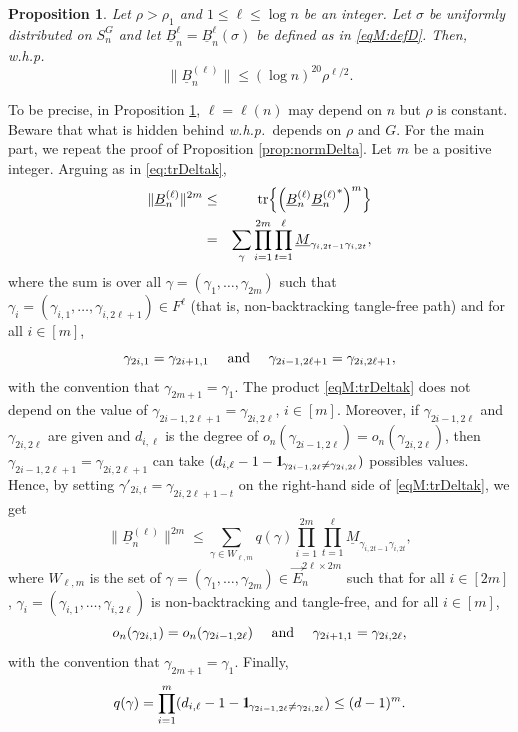 \documentclass[11pt]{article}
\newtheorem{proposition}[lemma]{Proposition}
\newcommand{\tr}{{\rm tr}}
\newcommand{\BRA}[1]{{{\left\{#1\right\}}}}
\newcommand{\PAR}[1]{{{\left(#1\right)}}} %
\newcommand{\uB}{{\underline B}}
\newcommand{\1}{1\!\!{\sf I}}\newcommand{\IND}{\1}
\newcommand{\whp}{{w.h.p.~}}
\begin{document}
\begin{proposition} \label{propM:normDelta}
Let  $\rho > \rho_1$ and $1 \leq \ell  \leq  \log n$ be an integer.  Let $\sigma$ be uniformly distributed on $S^G_n$ and  let $\uB^\ell _n = \uB^\ell_n (\sigma)$ be defined as in \eqref{eqM:defD}.  
Then, \whp  
$$ \| \uB_n^{(\ell)} \| \leq ( \log n) ^{20}   \rho ^{\ell/2}.$$
\end{proposition}
To be precise, in Proposition \ref{propM:normDelta}, $\ell = \ell(n)$ may depend on $n$ but $\rho$ is constant. Beware that what is hidden behind {\em\whp}depends on $\rho$ and $G$. For the main part, we repeat the proof of Proposition \ref{prop:normDelta}. Let $m$ be a positive integer.  Arguing as in \eqref{eq:trDeltak},
\begin{eqnarray}
\|\uB_n^{(\ell)}  \| ^{2 m}  & \leq & \tr \BRA{ \PAR{  \uB_n^{(\ell)}{\uB_n^{(\ell)}}^*}^{m}  } \nonumber\\
& =  &  \sum_{\gamma }   \prod_{i=1}^{2m}  \prod_{t=1}^{\ell} \underline M_{\gamma_{i,2t-1}  \gamma_{i,2t}} ,  \label{eqM:trDeltak}
\end{eqnarray}
where the sum is over all  $\gamma = ( \gamma_1, \ldots, \gamma_{2m})$ such that $\gamma_i = (\gamma_{i,1}, \ldots, \gamma_{i,2\ell+1}) \in F^{\ell}$ (that is, non-backtracking tangle-free path) and for all $i \in [m]$, 
$$
\gamma_{2i,1} = \gamma_{2i+1, 1} \quad \hbox{ and } \quad  \gamma_{2i-1,2\ell+1} = \gamma_{2i, 2\ell+1},
$$
with the convention that $\gamma_{2m+1} = \gamma_{1}$. The product \eqref{eqM:trDeltak} does not depend on the value of $\gamma_{2i-1,2\ell+1} = \gamma_{2i, 2\ell}$, $i \in[ m]$. Moreover, if $\gamma_{2i-1,2\ell}$ and $\gamma_{2i,2\ell}$ are given and $d_{i,\ell}$ is the degree of $o_n(\gamma_{2i-1,2\ell})  = o_n(\gamma_{2i,2\ell})$, then $\gamma_{2i-1,2\ell+1} = \gamma_{2i, 2\ell+1}$ can take $(d_{i,\ell} - 1 - \IND_{\gamma_{2i-1,2\ell} \ne \gamma_{2i, 2\ell}} )$ possibles values. Hence, by setting $\gamma'_{2i,t} = \gamma_{2i, 2 \ell +1 -t }$ on the right-hand side of \eqref{eqM:trDeltak}, we get 
\begin{equation}\label{eqM:trDeltak2}
\| \uB_n^{(\ell)}  \| ^{2 m}  \leq   \sum_{\gamma \in W_{\ell,m}}  q(\gamma) \prod_{i=1}^{2m}  \prod_{t=1}^{\ell} \underline M_{\gamma_{i,2t-1}  \gamma_{i,2t}} , 
\end{equation}
where $W_{\ell,m}$ is the set of $\gamma = ( \gamma_1, \ldots, \gamma_{2m}) \in   \vec E_n^{2 \ell \times 2m}$ such that for all $i \in [2m]$, $\gamma_i = (\gamma_{i,1}, \ldots, \gamma_{i,2\ell})$ is non-backtracking and tangle-free, and for all $i \in [m]$, 
\begin{equation}\label{eqM:defbound}
o_n(\gamma_{2i,1}) = o_n(\gamma_{2i-1, 2\ell})  \quad \hbox{ and } \quad  \gamma_{2i+1,1} = \gamma_{2i, 2\ell},
\end{equation}
with the convention that $\gamma_{2m+1} = \gamma_{1}$. Finally,
\begin{equation}\label{eqM:defqg}
q(\gamma)   = \prod_{i=1}^{m} ( d_{i,\ell} - 1 - \IND_{\gamma_{2i-1,2\ell} \ne \gamma_{2i, 2\ell}}  ) \leq (d-1)^{m}.
\end{equation}
\end{document}
